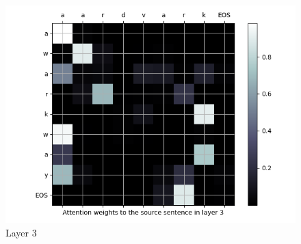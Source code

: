\begin{enumarabic}
\begin{figure}[H]
\begin{minipage}[b]{0.33\textwidth}
        \centering
        \includegraphics[width=\textwidth]{figures/aardvark-2.png}
        \caption{Layer 3}
        \label{fig:aardvark-2}
      \end{minipage}
    \end{figure}


\end{enumarabic}
